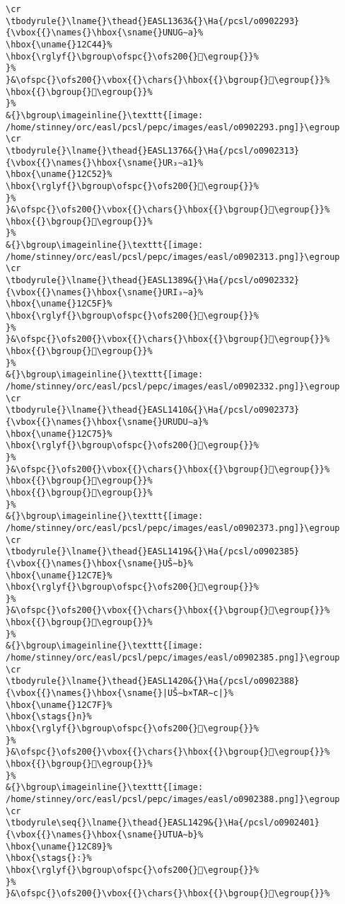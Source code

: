\begin{verbatim}
\cr
\tbodyrule{}\lname{}\thead{}EASL1363&{}\Ha{/pcsl/o0902293}{\vbox{{}\names{}\hbox{\sname{}UNUG∼a}%
\hbox{\uname{}12C44}%
\hbox{\rglyf{}\bgroup\ofspc{}\ofs200{}𒱄\egroup{}}%
}%
}&\ofspc{}\ofs200{}\vbox{{}\chars{}\hbox{{}\bgroup{}𒱆\egroup{}}%
\hbox{{}\bgroup{}𒱄\egroup{}}%
}%
&{}\bgroup\imageinline{}\texttt{[image: /home/stinney/orc/easl/pcsl/pepc/images/easl/o0902293.png]}\egroup
\cr
\tbodyrule{}\lname{}\thead{}EASL1376&{}\Ha{/pcsl/o0902313}{\vbox{{}\names{}\hbox{\sname{}UR₃∼a1}%
\hbox{\uname{}12C52}%
\hbox{\rglyf{}\bgroup\ofspc{}\ofs200{}𒱒\egroup{}}%
}%
}&\ofspc{}\ofs200{}\vbox{{}\chars{}\hbox{{}\bgroup{}𒱒\egroup{}}%
\hbox{{}\bgroup{}𒱓\egroup{}}%
}%
&{}\bgroup\imageinline{}\texttt{[image: /home/stinney/orc/easl/pcsl/pepc/images/easl/o0902313.png]}\egroup
\cr
\tbodyrule{}\lname{}\thead{}EASL1389&{}\Ha{/pcsl/o0902332}{\vbox{{}\names{}\hbox{\sname{}URI₃∼a}%
\hbox{\uname{}12C5F}%
\hbox{\rglyf{}\bgroup\ofspc{}\ofs200{}𒱟\egroup{}}%
}%
}&\ofspc{}\ofs200{}\vbox{{}\chars{}\hbox{{}\bgroup{}𒱟\egroup{}}%
\hbox{{}\bgroup{}𒱠\egroup{}}%
}%
&{}\bgroup\imageinline{}\texttt{[image: /home/stinney/orc/easl/pcsl/pepc/images/easl/o0902332.png]}\egroup
\cr
\tbodyrule{}\lname{}\thead{}EASL1410&{}\Ha{/pcsl/o0902373}{\vbox{{}\names{}\hbox{\sname{}URUDU∼a}%
\hbox{\uname{}12C75}%
\hbox{\rglyf{}\bgroup\ofspc{}\ofs200{}𒱵\egroup{}}%
}%
}&\ofspc{}\ofs200{}\vbox{{}\chars{}\hbox{{}\bgroup{}𒱳\egroup{}}%
\hbox{{}\bgroup{}𒱴\egroup{}}%
\hbox{{}\bgroup{}𒱵\egroup{}}%
}%
&{}\bgroup\imageinline{}\texttt{[image: /home/stinney/orc/easl/pcsl/pepc/images/easl/o0902373.png]}\egroup
\cr
\tbodyrule{}\lname{}\thead{}EASL1419&{}\Ha{/pcsl/o0902385}{\vbox{{}\names{}\hbox{\sname{}UŠ∼b}%
\hbox{\uname{}12C7E}%
\hbox{\rglyf{}\bgroup\ofspc{}\ofs200{}𒱾\egroup{}}%
}%
}&\ofspc{}\ofs200{}\vbox{{}\chars{}\hbox{{}\bgroup{}𒱾\egroup{}}%
\hbox{{}\bgroup{}𒲁\egroup{}}%
}%
&{}\bgroup\imageinline{}\texttt{[image: /home/stinney/orc/easl/pcsl/pepc/images/easl/o0902385.png]}\egroup
\cr
\tbodyrule{}\lname{}\thead{}EASL1420&{}\Ha{/pcsl/o0902388}{\vbox{{}\names{}\hbox{\sname{}|UŠ∼b×TAR∼c|}%
\hbox{\uname{}12C7F}%
\hbox{\stags{}n}%
\hbox{\rglyf{}\bgroup\ofspc{}\ofs200{}𒱿\egroup{}}%
}%
}&\ofspc{}\ofs200{}\vbox{{}\chars{}\hbox{{}\bgroup{}𒲂\egroup{}}%
\hbox{{}\bgroup{}𒱿\egroup{}}%
}%
&{}\bgroup\imageinline{}\texttt{[image: /home/stinney/orc/easl/pcsl/pepc/images/easl/o0902388.png]}\egroup
\cr
\tbodyrule\seq{}\lname{}\thead{}EASL1429&{}\Ha{/pcsl/o0902401}{\vbox{{}\names{}\hbox{\sname{}UTUA∼b}%
\hbox{\uname{}12C89}%
\hbox{\stags{}:}%
\hbox{\rglyf{}\bgroup\ofspc{}\ofs200{}𒲉\egroup{}}%
}%
}&\ofspc{}\ofs200{}\vbox{{}\chars{}\hbox{{}\bgroup{}𒲈\egroup{}}%

\end{verbatim}
